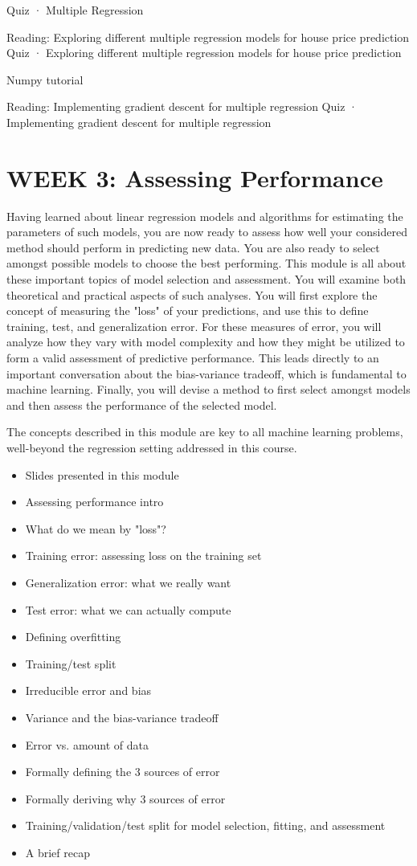 Quiz · Multiple Regression
\item Reading: Exploring different multiple regression models for house price prediction
Quiz · Exploring different multiple regression models for house price prediction
\item Numpy tutorial
\item Reading: Implementing gradient descent for multiple regression
Quiz · Implementing gradient descent for multiple regression

\section*{WEEK 3: Assessing Performance}
Having learned about linear regression models and algorithms for estimating the parameters of such models, you are now ready to assess how well your considered method should perform in predicting new data. You are also ready to select amongst possible models to choose the best performing.
This module is all about these important topics of model selection and assessment. You will examine both theoretical and practical aspects of such analyses. You will first explore the concept of measuring the "loss" of your predictions, and use this to define training, test, and generalization error. For these measures of error, you will analyze how they vary with model complexity and how they might be utilized to form a valid assessment of predictive performance. This leads directly to an important conversation about the bias-variance tradeoff, which is fundamental to machine learning. Finally, you will devise a method to first select amongst models and then assess the performance of the selected model.

The concepts described in this module are key to all machine learning problems, well-beyond the regression setting addressed in this course.
\begin{itemize}
\item Slides presented in this module
\item Assessing performance intro
\item What do we mean by "loss"?
\item Training error: assessing loss on the training set
\item Generalization error: what we really want
\item Test error: what we can actually compute
\item Defining overfitting
\item Training/test split
\item Irreducible error and bias
\item Variance and the bias-variance tradeoff
\item Error vs. amount of data
\item Formally defining the 3 sources of error
\item Formally deriving why 3 sources of error
\item Training/validation/test split for model selection, fitting, and assessment
\item A brief recap
\end{itemize}

